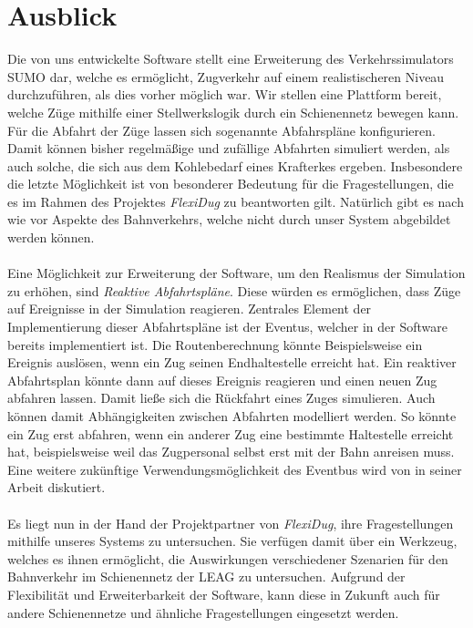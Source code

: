 \section{Ausblick}

Die von uns entwickelte Software stellt eine Erweiterung des Verkehrssimulators SUMO dar, welche es ermöglicht, Zugverkehr auf einem realistischeren Niveau durchzuführen, als dies vorher möglich war. Wir stellen eine Plattform bereit, welche Züge mithilfe einer Stellwerkslogik durch ein Schienennetz bewegen kann. Für die Abfahrt der Züge lassen sich sogenannte Abfahrspläne konfigurieren. Damit können bisher regelmäßige und zufällige Abfahrten simuliert werden, als auch solche, die sich aus dem Kohlebedarf eines Krafterkes ergeben. Insbesondere die letzte Möglichkeit ist von besonderer Bedeutung für die Fragestellungen, die es im Rahmen des Projektes \emph{FlexiDug} zu beantworten gilt. Natürlich gibt es nach wie vor Aspekte des Bahnverkehrs, welche nicht durch unser System abgebildet werden können.\\
\\
Eine Möglichkeit zur Erweiterung der Software, um den Realismus der Simulation zu erhöhen, sind \emph{Reaktive Abfahrtspläne}. Diese würden es ermöglichen, dass Züge auf Ereignisse in der Simulation reagieren. Zentrales Element der Implementierung dieser Abfahrtspläne ist der Eventus, welcher in der Software bereits implementiert ist. Die Routenberechnung könnte Beispielsweise ein Ereignis auslösen, wenn ein Zug seinen Endhaltestelle erreicht hat. Ein reaktiver Abfahrtsplan könnte dann auf dieses Ereignis reagieren und einen neuen Zug abfahren lassen. Damit ließe sich die Rückfahrt eines Zuges simulieren. Auch können damit Abhängigkeiten zwischen Abfahrten modelliert werden. So könnte ein Zug erst abfahren, wenn ein anderer Zug eine bestimmte Haltestelle erreicht hat, beispielsweise weil das Zugpersonal selbst erst mit der Bahn anreisen muss. Eine weitere zukünftige Verwendungsmöglichkeit des Eventbus wird von \citeauthor{persitzky_fehlerinjektion_2023} in seiner Arbeit\cite{persitzky_fehlerinjektion_2023} diskutiert.\\
\\
Es liegt nun in der Hand der Projektpartner von \emph{FlexiDug}, ihre Fragestellungen mithilfe unseres Systems zu untersuchen. Sie verfügen damit über ein Werkzeug, welches es ihnen ermöglicht, die Auswirkungen verschiedener Szenarien für den Bahnverkehr im Schienennetz der LEAG zu untersuchen. Aufgrund der Flexibilität und Erweiterbarkeit der Software, kann diese in Zukunft auch für andere Schienennetze und ähnliche Fragestellungen eingesetzt werden.
